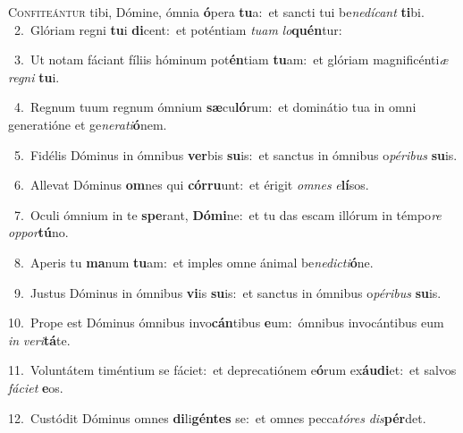 \lettrine{\initial\textcolor{\initialcolor}{C}}{onfiteántur} tibi, Dómine, ómnia \textbf{ó}\-pera \textbf{tu}\-a:~\star et sancti tui be\-\textit{ne}\-\textit{dí}\textit{cant} \textbf{ti}\-bi.\\
{\numbfont\textcolor{\numbcolor}{~2.}}~Glóriam regni \textbf{tu}\-i \textbf{di}\-cent:~\star et poténtiam \textit{tu}\-\textit{am} \textit{lo}\-\textbf{quén}tur:\par
{\numbfont\textcolor{\numbcolor}{~3.}}~Ut notam fáciant fíliis hóminum pot\-\textbf{én}\-tiam \textbf{tu}\-am:~\star et glóriam magnificénti\textit{æ} \textit{re}\-\textit{gni} \textbf{tu}\-i.\par
{\numbfont\textcolor{\numbcolor}{~4.}}~Regnum tuum regnum ómnium \textbf{sæ}\-cu\-\textbf{ló}\-rum:~\star et dominátio tua in omni generatióne et ge\-\textit{ne}\-\textit{ra}\textit{ti}\textbf{ó}nem.\par
{\numbfont\textcolor{\numbcolor}{~5.}}~Fidélis Dóminus in ómnibus \textbf{ver}\-bis \textbf{su}\-is:~\star et sanctus in ómnibus o\-\textit{pé}\-\textit{ri}\textit{bus} \textbf{su}\-is.\par
{\numbfont\textcolor{\numbcolor}{~6.}}~Allevat Dóminus \textbf{om}\-nes qui \textbf{cór}\-\textbf{ru}unt:~\star et érigit \textit{om}\-\textit{nes} \textit{e}\-\textbf{lí}sos.\par
{\numbfont\textcolor{\numbcolor}{~7.}}~Oculi ómnium in te \textbf{spe}\-rant, \textbf{Dó}\-\textbf{mi}ne:~\star et tu das escam illórum in témpo\textit{re} \textit{op}\-\textit{por}\textbf{tú}no.\par
{\numbfont\textcolor{\numbcolor}{~8.}}~Aperis tu \textbf{ma}\-num \textbf{tu}\-am:~\star et imples omne ánimal be\-\textit{ne}\-\textit{dic}\textit{ti}\textbf{ó}ne.\par
{\numbfont\textcolor{\numbcolor}{~9.}}~Justus Dóminus in ómnibus \textbf{vi}\-is \textbf{su}\-is:~\star et sanctus in ómnibus o\-\textit{pé}\-\textit{ri}\textit{bus} \textbf{su}\-is.\par
{\numbfont\textcolor{\numbcolor}{10.}}~Prope est Dóminus ómnibus invo\-\textbf{cán}\-tibus \textbf{e}\-um:~\star ómnibus invocántibus eum \textit{in} \textit{ve}\-\textit{ri}\textbf{tá}te.\par
{\numbfont\textcolor{\numbcolor}{11.}}~Voluntátem timéntium se fáciet:~\dagger et deprecatiónem e\-\textbf{ó}\-rum ex\-\textbf{áu}\-\textbf{di}et:~\star et salvos \textit{fá}\-\textit{ci}\textit{et} \textbf{e}\-os.\par
{\numbfont\textcolor{\numbcolor}{12.}}~Custódit Dóminus omnes \textbf{di}\-li\-\textbf{gén}\-\textbf{tes} se:~\star et omnes pecca\-\textit{tó}\-\textit{res} \textit{dis}\-\textbf{pér}det.\par
